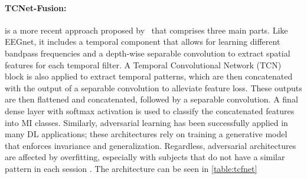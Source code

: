 \paragraph{TCNet-Fusion:} is a more recent approach proposed by~\cite{musallam2021electroencephalography} that comprises three main parts. Like EEGnet, it includes a temporal component that allows for learning different bandpass frequencies and a depth-wise separable convolution to extract spatial features for each temporal filter. A Temporal Convolutional Network (TCN) block is also applied to extract temporal patterns, which are then concatenated with the output of a separable convolution to alleviate feature loss. These outputs are then flattened and concatenated, followed by a separable convolution. A final dense layer with softmax activation is used to classify the concatenated features into MI classes. Similarly, adversarial learning has been successfully applied in many DL applications; these architectures rely on training a generative model that enforces invariance and generalization. Regardless, adversarial architectures are affected by overfitting, especially with subjects that do not have a similar pattern in each session \cite{ozdenizci2019adversarial}. The architecture can be seen in \cref{table:tcfnet}

